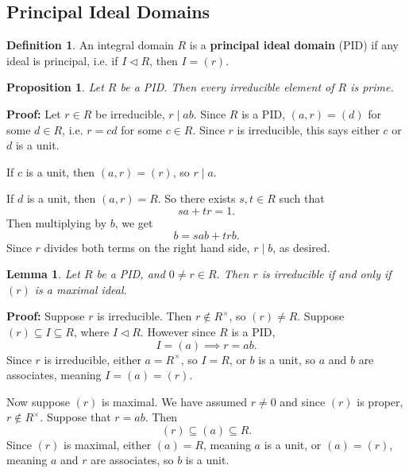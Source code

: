 \documentclass[12pt]{article}
\newtheorem{lemma}{Lemma}[section]
\newtheorem{proposition}{Proposition}[section]
\theoremstyle{definition}
\newtheorem{definition}{Definition}[section]
\theoremstyle{remark}
\begin{document}
\subsection{Principal Ideal Domains}%
\label{sub:principal_ideal_domains}

\begin{definition}
	An integral domain $R$ is a \textbf{principal ideal domain} (PID) if any ideal is principal, i.e. if $I \lhd R$, then $I = (r)$.
\end{definition}

\begin{proposition}
	Let $R$ be a PID. Then every irreducible element of $R$ is prime.
\end{proposition}

\begin{adjustbox}{minipage = \columnwidth - 25.5pt, margin=1em, frame=1pt, margin=0em}
	\textbf{Proof:} Let $r \in R$ be irreducible, $r \mid ab$. Since $R$ is a PID, $(a, r) = (d)$ for some $d \in R$, i.e. $r = cd$ for some $c \in R$. Since $r$ is irreducible, this says either $c$ or $d$ is a unit.

	If $c$ is a unit, then $(a, r) = (r)$, so $r \mid a$.

	If $d$ is a unit, then $(a, r) = R$. So there exists $s, t \in R$ such that
	\[
	sa + tr = 1
	.\]
	Then multiplying by $b$, we get
	\[
	b = sab + trb
	.\]
	Since $r$ divides both terms on the right hand side, $r \mid b$, as desired.
\end{adjustbox}

\begin{lemma}
	Let $R$ be a PID, and $0 \neq r \in R$. Then $r$ is irreducible if and only if $(r)$ is a maximal ideal.
\end{lemma}

\begin{adjustbox}{minipage = \columnwidth - 25.5pt, margin=1em, frame=1pt, margin=0em}
	\textbf{Proof:} Suppose $r$ is irreducible. Then $r \not \in R^{\times}$, so $(r) \neq R$. Suppose $(r) \subseteq I \subseteq R$, where $I \lhd R$. However since $R$ is a PID,
	\[
		I = (a) \implies r = ab
	.\]
	Since $r$ is irreducible, either $a = R^{\times}$, so $I = R$, or $b$ is a unit, so $a$ and $b$ are associates, meaning $I = (a) = (r)$.

	Now suppose $(r)$ is maximal. We have assumed $r \neq 0$ and since $(r)$ is proper, $r \not \in R^{\times}$. Suppose that $r = ab$. Then
	\[
		(r) \subseteq (a) \subseteq R
	.\]
	Since $(r)$ is maximal, either $(a) = R$, meaning $a$ is a unit, or $(a) = (r)$, meaning $a$ and $r$ are associates, so $b$ is a unit.
\end{adjustbox}
\end{document}
